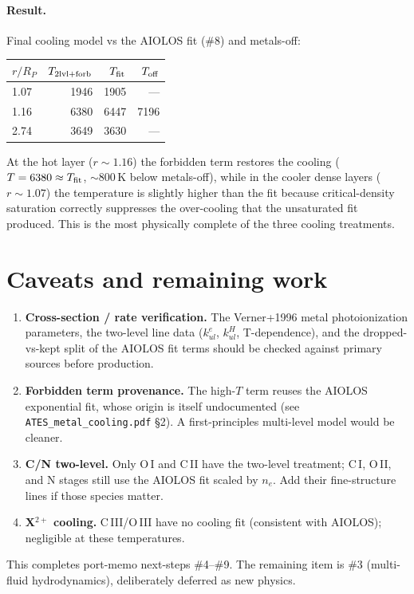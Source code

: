 \documentclass[english,a4paper]{kiseon_memo}
\begin{document}
\paragraph{Result.}  Final cooling model vs the AIOLOS fit (\#8) and
metals-off:
\begin{center}
\begin{tabular}{lrrr}
\toprule
$r/R_P$ & $T_{\rm 2lvl+forb}$ & $T_{\rm fit}$ & $T_{\rm off}$ \\
\midrule
1.07 & 1946 & 1905 & --- \\
1.16 & 6380 & 6447 & 7196 \\
2.74 & 3649 & 3630 & --- \\
\bottomrule
\end{tabular}
\end{center}
At the hot layer ($r\sim1.16$) the forbidden term restores the cooling
($T = 6380 \approx T_{\rm fit}$, $\sim 800$\,K below metals-off), while in
the cooler dense layers ($r\sim1.07$) the temperature is slightly higher
than the fit because critical-density saturation correctly suppresses the
over-cooling that the unsaturated fit produced. This is the most
physically complete of the three cooling treatments.

\section{Caveats and remaining work}

\begin{enumerate}
\item \textbf{Cross-section / rate verification.} The Verner+1996 metal
  photoionization parameters, the two-level line data ($k^e_{ul}$,
  $k^H_{ul}$, T-dependence), and the dropped-vs-kept split of the AIOLOS
  fit terms should be checked against primary sources before production.
\item \textbf{Forbidden term provenance.} The high-$T$ term reuses the
  AIOLOS exponential fit, whose origin is itself undocumented (see
  \texttt{ATES\_metal\_cooling.pdf} \S2). A first-principles multi-level
  model would be cleaner.
\item \textbf{C/N two-level.} Only O\,I and C\,II have the two-level
  treatment; C\,I, O\,II, and N stages still use the AIOLOS fit scaled by
  $n_e$.  Add their fine-structure lines if those species matter.
\item \textbf{X$^{2+}$ cooling.} C\,III/O\,III have no cooling fit
  (consistent with AIOLOS); negligible at these temperatures.
\end{enumerate}

This completes port-memo next-steps \#4--\#9. The remaining item is
\#3 (multi-fluid hydrodynamics), deliberately deferred as new physics.
\end{document}
